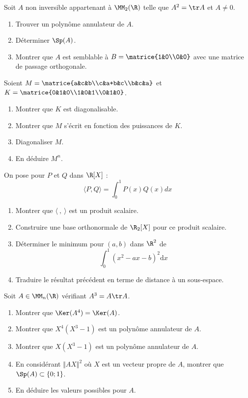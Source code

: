 \documentclass[french,11pt,twoside]{VcCours}
\newcommand{\dx}{\text{d}x}
\begin{document}
\begin{Exercice}
  Soit $A$ non inversible appartenant à $\MM_2(\R)$ telle que $A^2=\tr A$ et $A\neq0$.
  \begin{enumerate}
    \item Trouver un polynôme annulateur de $A$.
    \item Déterminer $\Sp(A)$.
    \item Montrer que $A$ est semblable à $B=\matrice{1&0\\0&0}$ avec une matrice de passage orthogonale.
  \end{enumerate}
\end{Exercice}


\begin{Exercice}
  Soient $M=\matrice{a&c&b\\c&a+b&c\\b&c&a}$ et
  $K=\matrice{0&1&0\\1&0&1\\0&1&0}$.
  \begin{enumerate}
    \item Montrer que $K$ est diagonalisable.
    \item Montrer que $M$ s’écrit en fonction des puissances de $K$.
    \item Diagonaliser $M$.
    \item En déduire $M^n$.
  \end{enumerate}
\end{Exercice}


\begin{Exercice}
  On pose pour $P$ et $Q$ dans $\R[X]$ : 
  \[\langle P, Q\rangle = \int_0^1P(x)Q(x)dx\]
  \begin{enumerate}
    \item Montrer que $\langle\ ,\ \rangle$ est un produit scalaire.
    \item Construire une base orthonormale de $\R_2[X]$ pour ce produit scalaire.
    \item Déterminer le minimum pour $(a,b)$ dans $\R^2$ de
          \[\int_0^1(x^2-ax-b)^2\dx\]
    \item Traduire le résultat précédent en terme de distance à un sous-espace.
  \end{enumerate}
\end{Exercice}


\begin{Exercice}
  Soit $A\in\MM_n(\R)$ vérifiant $A^3=A\tr A$.
  \begin{enumerate}
    \item Montrer que $\Ker(A^4)=\Ker(A)$.
    \item Montrer que $X^4(X^3-1)$ est un polynôme annulateur de $A$.
    \item Montrer que $X(X^3-1)$ est un polynôme annulateur de $A$.
    \item En considérant $\Vert AX\Vert^2$
    où $X$ est un vecteur propre de $A$, 
    montrer que $\Sp(A)\subset\{0;1\}$.
    \item En déduire les valeurs possibles pour $A$.
  \end{enumerate}
\end{Exercice}
\end{document}
